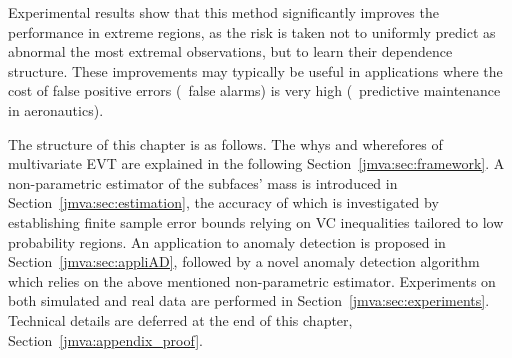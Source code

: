 Experimental results show that this method significantly
improves the performance in extreme regions, as  %
the risk
is taken not to uniformly predict as abnormal the most extremal observations, but to learn their dependence structure.
These improvements may typically be useful in applications where the cost of false positive errors (\ie~false alarms) is very high (\eg~predictive maintenance in aeronautics).


\bigskip
The structure of this chapter is as follows.  The whys
and wherefores of multivariate EVT are explained in the following
Section~\ref{jmva:sec:framework}. A non-parametric estimator of the
subfaces' mass is introduced in Section~\ref{jmva:sec:estimation}, the
accuracy of which is
investigated by establishing %
finite sample error bounds relying on  {\sc VC} inequalities
tailored to low probability regions.
An application to anomaly detection is proposed in Section~\ref{jmva:sec:appliAD}, followed by a novel anomaly detection algorithm which relies on the above mentioned non-parametric estimator. 
Experiments on both simulated and real data are performed in Section~\ref{jmva:sec:experiments}. Technical details are deferred at the end of this chapter, Section~\ref{jmva:appendix_proof}.

